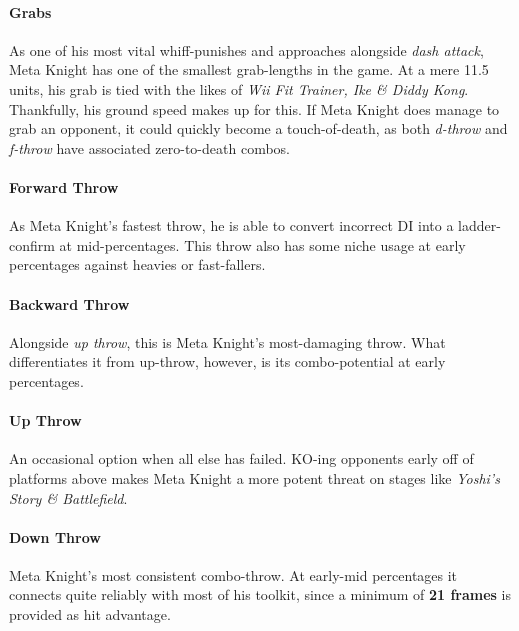 \paragraph{Grabs}
As one of his most vital whiff-punishes and approaches alongside \textit{dash attack}, Meta Knight has one of the smallest grab-lengths in the game. At a mere 11.5 units, his grab is tied with the likes of \textit{Wii Fit Trainer, Ike \& Diddy Kong}. Thankfully, his ground speed makes up for this. If Meta Knight does manage to grab an opponent, it could quickly become a touch-of-death, as both \textit{d-throw} and \textit{f-throw} have associated zero-to-death combos.
\paragraph{Forward Throw}
As Meta Knight's fastest throw, he is able to convert incorrect DI into a ladder-confirm at mid-percentages. This throw also has some niche usage at early percentages against heavies or fast-fallers.
\paragraph{Backward Throw}
Alongside \textit{up throw}, this is Meta Knight's most-damaging throw. What differentiates it from up-throw, however, is its combo-potential at early percentages.
\paragraph{Up Throw}
An occasional option when all else has failed. KO-ing opponents early off of platforms above makes Meta Knight a more potent threat on stages like \textit{Yoshi's Story \& Battlefield}.
\paragraph{Down Throw}
Meta Knight's most consistent combo-throw. At early-mid percentages it connects quite reliably with most of his toolkit, since a minimum of \textbf{21 frames} is provided as hit advantage.